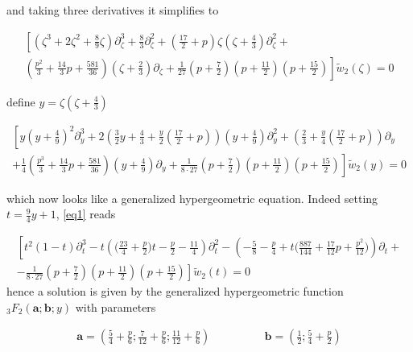 \documentclass{article}
\begin{document}
and taking three derivatives it simplifies to 

\begin{multline}
\left[\left(\zeta^3+2\zeta^2+\frac{8}{9}\zeta\right)\partial_\zeta^3 +\frac{8}{3}\partial_\zeta^2+\left(\frac{17}{2}+p\right)\zeta\left(\zeta+\frac{4}{3}\right)\partial_\zeta^2+\right.\\
\left. \left(\frac{p^2}{3}+\frac{14}{3}p+\frac{581}{36}\right)\left(\zeta+\frac{2}{3}\right)\partial_\zeta+\frac{1}{27}\left(p+\frac{7}{2}\right)\left(p+\frac{11}{2}\right)\left(p+\frac{15}{2}\right)\right]\tilde{w}_2(\zeta)=0
\end{multline}

define $y=\zeta\left(\zeta+\frac{4}{3}\right)$

\begin{multline}\label{eq1}
\left[y\left(y+\frac{4}{9}\right)^2\partial_y^3+2\left(\frac{3}{2}y+\frac{4}{3}+\frac{y}{2}\left(\frac{17}{2}+p\right)\right)\left(y+\frac{4}{9}\right)\partial_y^2+\left(\frac{2}{3}+\frac{y}{4}\left(\frac{17}{2}+p\right)\right)\partial_y\right.\\
\left.+\frac{1}{4}\left(\frac{p^3}{3}+\frac{14}{3}p+\frac{581}{36}\right)\left(y+\frac{4}{9}\right)\partial_y+\frac{1}{8\cdot 27}\left(p+\frac{7}{2}\right)\left(p+\frac{11}{2}\right)\left(p+\frac{15}{2}\right)\right]\tilde{w}_2(y)=0
\end{multline}

which now looks like a generalized hypergeometric equation. Indeed setting $t=\tfrac{9}{4}y+1$, \eqref{eq1} reads

\begin{multline}
\left[t^2(1-t)\partial_t^3-t\left(\big(\frac{23}{4}+\frac{p}{2}\big)t-\frac{p}{2}-\frac{11}{4}\right)\partial_t^2-\left(-\frac{5}{8}-\frac{p}{4}+t\Big(\frac{887}{144}+\frac{17}{12}p+\frac{p^2}{12}\Big)\right)\partial_t +\right.\\
\left. -\frac{1}{8\cdot 27}\left(p+\frac{7}{2}\right)\left(p+\frac{11}{2}\right)\left(p+\frac{15}{2}\right)\right]\tilde{w}_2(t)=0
\end{multline}
hence a solution is given by the generalized hypergeometric function ${}_3F_2\left(\mathbf{a};\mathbf{b};y\right)$ with parameters

\begin{align*}
\mathbf{a}=\left(\frac{5}{4}+\frac{p}{6};\frac{7}{12}+\frac{p}{6};\frac{11}{12}+\frac{p}{6}\right) & \qquad\qquad \mathbf{b}=\left(\frac{1}{2};\frac{5}{4}+\frac{p}{2}\right)
\end{align*}
\end{document}
